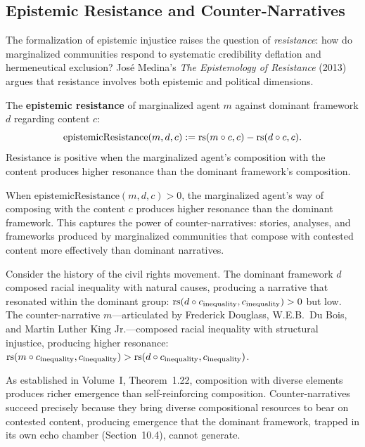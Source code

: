 \subsection{Epistemic Resistance and Counter-Narratives}

The formalization of epistemic injustice raises the question of \emph{resistance}:
how do marginalized communities respond to systematic credibility deflation and
hermeneutical exclusion? José Medina's \emph{The Epistemology of Resistance} (2013)
argues that resistance involves both epistemic and political dimensions.

\begin{definition}
\label{def:epistemic-resistance}
The \textbf{epistemic resistance} of marginalized agent $m$ against dominant
framework $d$ regarding content $c$:
\[
  \mathrm{epistemicResistance}(m, d, c) := \mathrm{rs}(m \circ c, c) - \mathrm{rs}(d \circ c, c).
\]
Resistance is positive when the marginalized agent's composition with the
content produces higher resonance than the dominant framework's composition.
\end{definition}

\begin{interpretation}
When $\mathrm{epistemicResistance}(m, d, c) > 0$, the marginalized agent's
way of composing with the content $c$ produces higher resonance than the
dominant framework. This captures the power of counter-narratives: stories,
analyses, and frameworks produced by marginalized communities that compose
with contested content more effectively than dominant narratives.

Consider the history of the civil rights movement. The dominant framework
$d$ composed racial inequality with natural causes, producing a narrative that
resonated within the dominant group: $\mathrm{rs}(d \circ c_{\text{inequality}},
c_{\text{inequality}}) > 0$ but low. The counter-narrative $m$---articulated
by Frederick Douglass, W.E.B.\ Du Bois, and Martin Luther King Jr.---composed
racial inequality with structural injustice, producing higher resonance:
$\mathrm{rs}(m \circ c_{\text{inequality}}, c_{\text{inequality}}) >
\mathrm{rs}(d \circ c_{\text{inequality}}, c_{\text{inequality}})$.

As established in Volume~I, Theorem~1.22, composition with diverse elements
produces richer emergence than self-reinforcing composition. Counter-narratives
succeed precisely because they bring diverse compositional resources to bear on
contested content, producing emergence that the dominant framework, trapped in
its own echo chamber (Section~10.4), cannot generate.
\end{interpretation}

